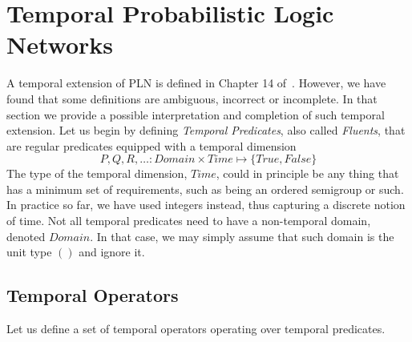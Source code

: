 \documentclass[runningheads]{llncs}
\newcommand{\TTrue}{\textit{True}}
\newcommand{\TFalse}{\textit{False}}
\newcommand{\TTime}{\textit{Time}}
\begin{document}
\section{Temporal Probabilistic Logic Networks}
\label{sec:temporal}
A temporal extension of PLN is defined in Chapter 14
of~\cite{Goertzel09PLN}.  However, we have found that some definitions
are ambiguous, incorrect or incomplete.  In that section we provide a
possible interpretation and completion of such temporal extension.
Let us begin by defining \emph{Temporal Predicates}, also called
\emph{Fluents}, that are regular predicates equipped with a temporal
dimension
$$P, Q, R, \hdots: \textit{Domain} \times \TTime \mapsto \{\TTrue,
\TFalse\}$$
\noindent The type of the temporal dimension, $\TTime$, could in
principle be any thing that has a minimum set of requirements, such as
being an ordered semigroup or such.  In practice so far, we have used
integers instead, thus capturing a discrete notion of time.  Not all
temporal predicates need to have a non-temporal domain, denoted
$\textit{Domain}$.  In that case, we may simply assume that such
domain is the unit type $()$ and ignore it.

\subsection{Temporal Operators}
Let us define a set of temporal operators operating over temporal
predicates.
\end{document}
